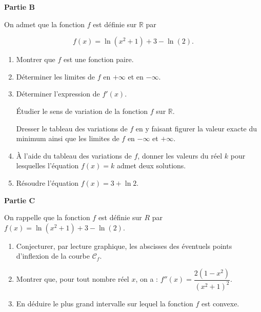 \documentclass[10pt]{article}
\providecommand{\R}{\mathbb{R}}
\begin{document}
\textbf{Partie B}

\medskip

On admet que la fonction $f$ est définie sur $\R$ par 

\[f(x) = \ln \left(x^2 + 1\right) + 3 - \ln (2).\]

\medskip

\begin{enumerate}
\item Montrer que $f$ est une fonction paire.
\item Déterminer les limites de $f$ en $+\infty$ et en $-\infty$.
\item Déterminer l'expression de $f'(x)$.

Étudier le sens de variation de la fonction $f$ sur $\R$.

Dresser le tableau des variations de $f$ en y faisant figurer la valeur exacte du minimum ainsi que les limites de $f$ en $-\infty$ et $+\infty$.
\item À l'aide du tableau des variations de $f$, donner les valeurs du réel $k$ pour lesquelles l'équation $f(x) = k$ admet deux solutions.
\item Résoudre l'équation $f(x) = 3 + \ln 2$.
\end{enumerate}

\bigskip

\textbf{Partie C}

\medskip

On rappelle que la fonction $f$ est définie sur $R$ par $f(x) = \ln \left(x^2 + 1\right) + 3 - \ln (2)$.

\medskip

\begin{enumerate}
\item Conjecturer, par lecture graphique, les abscisses des éventuels points d'inflexion
de la courbe $\mathcal{C}_f$.
\item Montrer que, pour tout nombre réel $x$, on a : $f''(x) = \dfrac{2\left(1 - x^2\right)}{\left(x^2 + 1\right)^2}$.
\item En déduire le plus grand intervalle sur lequel la fonction $f$ est convexe.
\end{enumerate}
\end{document}
